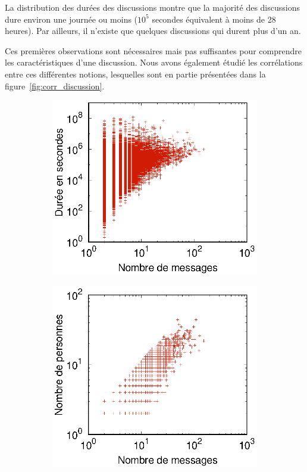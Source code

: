 La distribution des durées des discussions montre que la majorité des discussions dure environ une journée ou moins ($10^5$ secondes équivalent à moins de 28 heures).
Par ailleurs, il n'existe que quelques discussions qui durent plus d'un an.

Ces premières observations sont nécessaires mais pas suffisantes pour comprendre les caractéristiques d'une discussion.
Nous avons également étudié les corrélations entre ces différentes notions, lesquelles sont en partie présentées dans la figure~\ref{fig:corr_discussion}.


\begin{figure}
	\centering
	\begin{subfigure}{0.4\textwidth}
		\includegraphics[width=\linewidth]{img/mailing/sizes-durations-corr.eps}
		\caption{\label{fig:corr_discussion_duration}}		
	\end{subfigure}
	\begin{subfigure}{0.4\textwidth}
		\includegraphics[width=\linewidth]{img/mailing/sizes-authors-corr.eps}
		\caption{\label{fig:corr_discussion_author}}
	\end{subfigure}


\end{figure}
